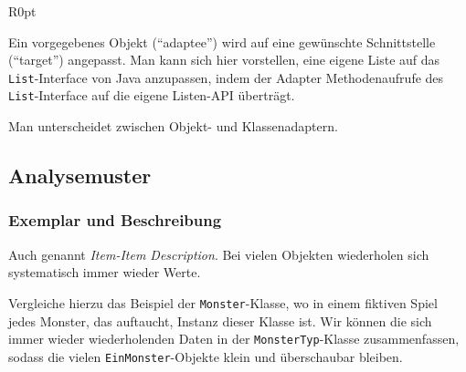 \documentclass{panikzettel}
\begin{document}
\begin{wrapfigure}[10]{R}{0pt}
\end{wrapfigure}

Ein vorgegebenes Objekt (``adaptee'') wird auf eine gewünschte Schnittstelle (``target'') angepasst. Man kann sich hier vorstellen, eine eigene Liste auf das \lstinline{List}-Interface von Java anzupassen, indem der Adapter Methodenaufrufe des \lstinline{List}-Interface auf die eigene Listen-API überträgt.

Man unterscheidet zwischen Objekt- und Klassenadaptern. %

\subsection{Analysemuster}

\subsubsection{Exemplar und Beschreibung}

Auch genannt \emph{Item-Item Description}. Bei vielen Objekten wiederholen sich systematisch immer wieder Werte.

Vergleiche hierzu das Beispiel der \lstinline{Monster}-Klasse, wo in einem fiktiven Spiel jedes Monster, das auftaucht, Instanz dieser Klasse ist. Wir können die sich immer wieder wiederholenden Daten in der \lstinline{MonsterTyp}-Klasse zusammenfassen, sodass die vielen \lstinline{EinMonster}-Objekte klein und überschaubar bleiben.

\end{document}

